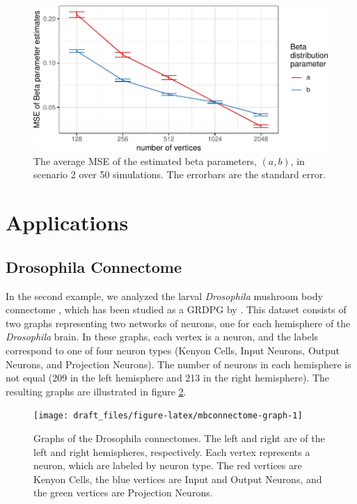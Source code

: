 \documentclass[12pt]{article}
\begin{document}
\begin{figure}[H]

{\centering \includegraphics{draft_files/figure-latex/beta-mse-1} 

}

\caption{The average MSE of the estimated beta parameters, $(a, b)$, in scenario 2 over 50 simulations. The errorbars are the standard error.}\label{fig:beta-mse}
\end{figure}

\section{Applications}\label{applications}

\subsection{Drosophila Connectome}\label{drosophila-connectome}

In the second example, we analyzed the larval \emph{Drosophila} mushroom
body connectome \citep{Eichler141762}, which has been studied as a GRDPG
by \citet{athreya2020estimation}. This dataset consists of two graphs
representing two networks of neurons, one for each hemisphere of the
\emph{Drosophila} brain. In these graphs, each vertex is a neuron, and
the labels correspond to one of four neuron types (Kenyon Cells, Input
Neurons, Output Neurons, and Projection Neurons). The number of neurons
in each hemisphere is not equal (209 in the left hemisphere and 213 in
the right hemisphere). The resulting graphs are illustrated in figure
\ref{fig:mbconnectome-graph}.

\begin{figure}[H]

{\centering \texttt{[image: draft\_files/figure-latex/mbconnectome-graph-1]} 

}

\caption{Graphs of the Drosophila connectomes. The left and right are of the left and right hemispheres, respectively. Each vertex represents a neuron, which are labeled by neuron type. The red vertices are Kenyon Cells, the blue vertices are Input and Output Neurons, and the green vertices are Projection Neurons.}\label{fig:mbconnectome-graph}
\end{figure}
\end{document}
